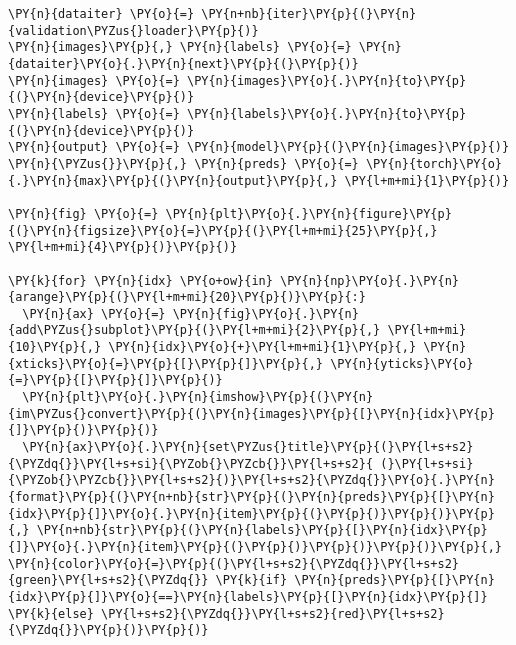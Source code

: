     \begin{tcolorbox}[breakable, size=fbox, boxrule=1pt, pad at break*=1mm,colback=cellbackground, colframe=cellborder]
\begin{Verbatim}[commandchars=\\\{\}]
\PY{n}{dataiter} \PY{o}{=} \PY{n+nb}{iter}\PY{p}{(}\PY{n}{validation\PYZus{}loader}\PY{p}{)}
\PY{n}{images}\PY{p}{,} \PY{n}{labels} \PY{o}{=} \PY{n}{dataiter}\PY{o}{.}\PY{n}{next}\PY{p}{(}\PY{p}{)}
\PY{n}{images} \PY{o}{=} \PY{n}{images}\PY{o}{.}\PY{n}{to}\PY{p}{(}\PY{n}{device}\PY{p}{)}
\PY{n}{labels} \PY{o}{=} \PY{n}{labels}\PY{o}{.}\PY{n}{to}\PY{p}{(}\PY{n}{device}\PY{p}{)}
\PY{n}{output} \PY{o}{=} \PY{n}{model}\PY{p}{(}\PY{n}{images}\PY{p}{)}
\PY{n}{\PYZus{}}\PY{p}{,} \PY{n}{preds} \PY{o}{=} \PY{n}{torch}\PY{o}{.}\PY{n}{max}\PY{p}{(}\PY{n}{output}\PY{p}{,} \PY{l+m+mi}{1}\PY{p}{)}

\PY{n}{fig} \PY{o}{=} \PY{n}{plt}\PY{o}{.}\PY{n}{figure}\PY{p}{(}\PY{n}{figsize}\PY{o}{=}\PY{p}{(}\PY{l+m+mi}{25}\PY{p}{,} \PY{l+m+mi}{4}\PY{p}{)}\PY{p}{)}

\PY{k}{for} \PY{n}{idx} \PY{o+ow}{in} \PY{n}{np}\PY{o}{.}\PY{n}{arange}\PY{p}{(}\PY{l+m+mi}{20}\PY{p}{)}\PY{p}{:}
  \PY{n}{ax} \PY{o}{=} \PY{n}{fig}\PY{o}{.}\PY{n}{add\PYZus{}subplot}\PY{p}{(}\PY{l+m+mi}{2}\PY{p}{,} \PY{l+m+mi}{10}\PY{p}{,} \PY{n}{idx}\PY{o}{+}\PY{l+m+mi}{1}\PY{p}{,} \PY{n}{xticks}\PY{o}{=}\PY{p}{[}\PY{p}{]}\PY{p}{,} \PY{n}{yticks}\PY{o}{=}\PY{p}{[}\PY{p}{]}\PY{p}{)}
  \PY{n}{plt}\PY{o}{.}\PY{n}{imshow}\PY{p}{(}\PY{n}{im\PYZus{}convert}\PY{p}{(}\PY{n}{images}\PY{p}{[}\PY{n}{idx}\PY{p}{]}\PY{p}{)}\PY{p}{)}
  \PY{n}{ax}\PY{o}{.}\PY{n}{set\PYZus{}title}\PY{p}{(}\PY{l+s+s2}{\PYZdq{}}\PY{l+s+si}{\PYZob{}\PYZcb{}}\PY{l+s+s2}{ (}\PY{l+s+si}{\PYZob{}\PYZcb{}}\PY{l+s+s2}{)}\PY{l+s+s2}{\PYZdq{}}\PY{o}{.}\PY{n}{format}\PY{p}{(}\PY{n+nb}{str}\PY{p}{(}\PY{n}{preds}\PY{p}{[}\PY{n}{idx}\PY{p}{]}\PY{o}{.}\PY{n}{item}\PY{p}{(}\PY{p}{)}\PY{p}{)}\PY{p}{,} \PY{n+nb}{str}\PY{p}{(}\PY{n}{labels}\PY{p}{[}\PY{n}{idx}\PY{p}{]}\PY{o}{.}\PY{n}{item}\PY{p}{(}\PY{p}{)}\PY{p}{)}\PY{p}{)}\PY{p}{,} \PY{n}{color}\PY{o}{=}\PY{p}{(}\PY{l+s+s2}{\PYZdq{}}\PY{l+s+s2}{green}\PY{l+s+s2}{\PYZdq{}} \PY{k}{if} \PY{n}{preds}\PY{p}{[}\PY{n}{idx}\PY{p}{]}\PY{o}{==}\PY{n}{labels}\PY{p}{[}\PY{n}{idx}\PY{p}{]} \PY{k}{else} \PY{l+s+s2}{\PYZdq{}}\PY{l+s+s2}{red}\PY{l+s+s2}{\PYZdq{}}\PY{p}{)}\PY{p}{)}
\end{Verbatim}
\end{tcolorbox}

    \begin{center}
    \end{center}
    { \hspace*{\fill} \\}

